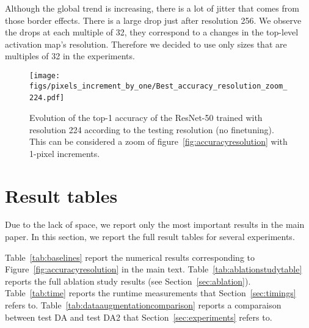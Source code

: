 Although the global trend is increasing, there is a lot of jitter that comes from those border effects. 
There is a large drop just after resolution 256.
We observe the drops at each multiple of 32, they correspond to a changes in the top-level activation map's resolution.
Therefore we decided to use only sizes that are multiples of 32 in the experiments. 

\begin{figure}[t]
\begin{center}
\texttt{[image: figs/pixels\_increment\_by\_one/Best\_accuracy\_resolution\_zoom\_224.pdf]}~\end{center}
\caption{\label{fig:onepixels}
    Evolution of the top-1 accuracy of the ResNet-50 trained with resolution 224 according to the testing resolution (no finetuning).
    This can be considered a zoom of figure~\ref{fig:accuracyresolution} with 1-pixel increments.
}
\end{figure}





\section{Result tables}
\label{sec:resulttables}

Due to the lack of space, we report only the most important results in the main paper. 
In this section, we report the full result tables for several experiments.

Table~\ref{tab:baselines} report the numerical results corresponding to Figure~\ref{fig:accuracyresolution} in the main text.
Table~\ref{tab:ablationstudytable} reports the full ablation study results (see Section~\ref{sec:ablation}). 
\label{sec:supptimings}
Table~\ref{tab:time} reports the runtime measurements that Section~\ref{sec:timings} refers to.
Table~\ref{tab:dataaugmentationcomparison} reports a comparaison between test DA and test DA2 that Section~\ref{sec:experiments} refers to. 
 
